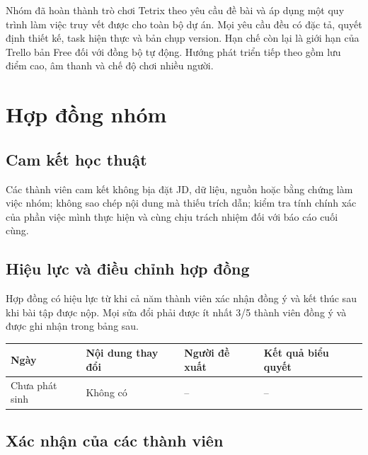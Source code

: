 \documentclass[12pt,a4paper]{article}
\begin{document}
Nhóm đã hoàn thành trò chơi Tetrix theo yêu cầu đề bài và áp dụng một quy trình
làm việc truy vết được cho toàn bộ dự án. Mọi yêu cầu đều có đặc tả, quyết định
thiết kế, task hiện thực và bản chụp version. Hạn chế còn lại là giới hạn của
Trello bản Free đối với đồng bộ tự động. Hướng phát triển tiếp theo gồm lưu điểm
cao, âm thanh và chế độ chơi nhiều người.

\appendix

\section{Hợp đồng nhóm}

\subsection{Cam kết học thuật}

Các thành viên cam kết không bịa đặt JD, dữ liệu, nguồn hoặc bằng chứng làm
việc nhóm; không sao chép nội dung mà thiếu trích dẫn; kiểm tra tính chính xác
của phần việc mình thực hiện và cùng chịu trách nhiệm đối với báo cáo cuối cùng.

\subsection{Hiệu lực và điều chỉnh hợp đồng}

Hợp đồng có hiệu lực từ khi cả năm thành viên xác nhận đồng ý và kết thúc sau khi
bài tập được nộp. Mọi sửa đổi phải được ít nhất 3/5 thành viên đồng ý và được
ghi nhận trong bảng sau.

\begin{table}[H]
  \centering
  \small
  \begin{tabularx}{\textwidth}{P{2.3cm} Y P{3.0cm} P{3.0cm}}
    \toprule
    \textbf{Ngày} & \textbf{Nội dung thay đổi} & \textbf{Người đề xuất} & \textbf{Kết quả biểu quyết} \\
    \midrule
    Chưa phát sinh & Không có & -- & -- \\
    \bottomrule
  \end{tabularx}
\end{table}

\subsection{Xác nhận của các thành viên}
\end{document}
